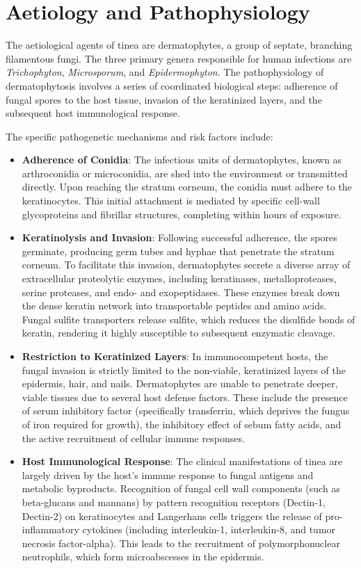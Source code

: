 \section*{Aetiology and Pathophysiology}
The aetiological agents of tinea are dermatophytes, a group of septate, branching filamentous fungi. The three primary genera responsible for human infections are \textit{Trichophyton}, \textit{Microsporum}, and \textit{Epidermophyton}. The pathophysiology of dermatophytosis involves a series of coordinated biological steps: adherence of fungal spores to the host tissue, invasion of the keratinized layers, and the subsequent host immunological response.

The specific pathogenetic mechanisms and risk factors include:
\begin{itemize}
    \item \textbf{Adherence of Conidia}: The infectious units of dermatophytes, known as arthroconidia or microconidia, are shed into the environment or transmitted directly. Upon reaching the stratum corneum, the conidia must adhere to the keratinocytes. This initial attachment is mediated by specific cell-wall glycoproteins and fibrillar structures, completing within hours of exposure.
    \item \textbf{Keratinolysis and Invasion}: Following successful adherence, the spores germinate, producing germ tubes and hyphae that penetrate the stratum corneum. To facilitate this invasion, dermatophytes secrete a diverse array of extracellular proteolytic enzymes, including keratinases, metalloproteases, serine proteases, and endo- and exopeptidases. These enzymes break down the dense keratin network into transportable peptides and amino acids. Fungal sulfite transporters release sulfite, which reduces the disulfide bonds of keratin, rendering it highly susceptible to subsequent enzymatic cleavage.
    \item \textbf{Restriction to Keratinized Layers}: In immunocompetent hosts, the fungal invasion is strictly limited to the non-viable, keratinized layers of the epidermis, hair, and nails. Dermatophytes are unable to penetrate deeper, viable tissues due to several host defense factors. These include the presence of serum inhibitory factor (specifically transferrin, which deprives the fungus of iron required for growth), the inhibitory effect of sebum fatty acids, and the active recruitment of cellular immune responses.
    \item \textbf{Host Immunological Response}: The clinical manifestations of tinea are largely driven by the host's immune response to fungal antigens and metabolic byproducts. Recognition of fungal cell wall components (such as beta-glucans and mannans) by pattern recognition receptors (Dectin-1, Dectin-2) on keratinocytes and Langerhans cells triggers the release of pro-inflammatory cytokines (including interleukin-1, interleukin-8, and tumor necrosis factor-alpha). This leads to the recruitment of polymorphonuclear neutrophils, which form microabscesses in the epidermis.

\end{itemize}
